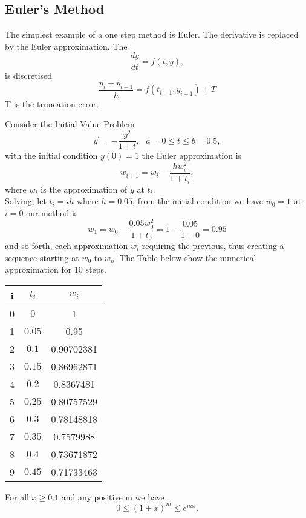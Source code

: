 \subsection{Euler's Method}
The simplest example of a one step method is Euler. The derivative is replaced
by the Euler approximation. The 
\[ \frac{dy}{dt}=f(t,y), \]
is discretised
\[\frac{y_i-y_{i-1}}{h}=f(t_{i-1},y_{i-1}) +T\]
T is the truncation error.\\
\begin{example}
Consider the Initial Value Problem
\[y^{'} = -\frac{y^2}{1+t}, \ \ \ a=0\leq t \leq b=0.5, \]
with the initial condition $y(0)=1$
the Euler approximation is
\[w_{i+1}=w_i -\frac{hw_i^2}{1+t_i}, \]
where $w_i$ is the approximation of $y$ at $t_i$.\\
Solving, let $t_i=ih$ where $h=0.05$, from the initial condition we have
$w_0=1$
at $i=0$ our method is 
\[w_1=w_0-\frac{0.05w^2_0}{1+t_0}=1-\frac{0.05}{1+0}=0.95 \]
and so forth, each approximation $w_i$ requiring the previous, thus creating a 
sequence starting at $w_0$ to $w_n$. The Table below show the numerical approximation for 10 steps.
\begin{center}
\begin{tabular}{ c| c |c }
  i& $t_i$& $w_i$\\
  \hline
 0 & $0$  & 1 \\  
 1 & $0.05$  & 0.95 \\  
 2 & $0.1$  & 0.90702381 \\  
 3 & $0.15$  & 0.86962871 \\  
 4 & $0.2$  & 0.8367481 \\  
 5 & $0.25$  & 0.80757529 \\  
 6 & $0.3$  & 0.78148818 \\  
 7 & $0.35$  & 0.7579988 \\  
 8 & $0.4$  & 0.73671872 \\  
 9 & $0.45$  & 0.71733463  
\end{tabular}
\end{center}
\end{example}

\begin{lemma}
\label{lemma 1}
For all $ x \geq 0.1$ and any positive m we have \[0\leq (1+x)^m \leq e^{mx}.\]
\end{lemma}

